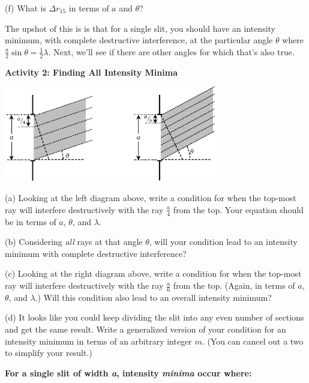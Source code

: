 (f) What is $\Delta r_{15}$ in terms of $a$ and $\theta$?
\answerspace{0.4in}

The upshot of this is is that for a single slit, you should have an intensity minimum, with complete destructive interference, at the particular angle $\theta$ where $\frac{a}{2} \sin \theta = \frac{1}{2}\lambda$.  Next, we'll see if there are other angles for which that's also true.

\pagebreak[3]
\textbf{Activity 2: Finding All Intensity Minima}

\vspace{-0.2in}
\begin{center}
\includegraphics[width=0.7\textwidth]{diffraction_of_light/fourths_and_sixths.eps}
\end{center}
\vspace{-0.2in}

(a) Looking at the left diagram above, write a condition for when the top-most ray will interfere destructively with the ray $\frac{a}{4}$ from the top.  Your equation should be in terms of $a$, $\theta$, and $\lambda$.  
\answerspace{0.4in}

(b) Considering \textit{all} rays at that angle $\theta$, will your condition lead to an intensity minimum with complete destructive interference?
\answerspace{0.4in}

(c) Looking at the right diagram above, write a condition for when the top-most ray will interfere destructively with the ray $\frac{a}{6}$ from the top.  (Again, in terms of $a$, $\theta$, and $\lambda$.)  Will this condition also lead to an overall intensity minimum?
\answerspace{0.4in}

(d) It looks like you could keep dividing the slit into any even number of sections and get the same result.  Write a generalized version of your condition for an intensity minimum in terms of an arbitrary integer $m$.  (You can cancel out a two to simplify your result.)

\answerspace{0.1in}
\hspace{0.8in}\textbf{For a single slit of width \textit{a}, intensity \textit{minima} occur where: }
\answerspace{0.1in}

